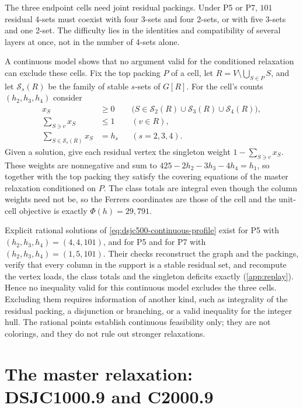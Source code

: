 \documentclass[11pt]{article}
\theoremstyle{definition}
\newcommand{\DSJCThousand}{\textnormal{\textsc{DSJC1000.9}}}
\newcommand{\CTwoThousand}{\textnormal{\textsc{C2000.9}}}
\newcommand{\Stable}{\mathcal{S}}
\begin{document}
The three endpoint cells need joint residual packings. Under P5 or P7,
$101$ residual 4-sets must coexist with four 3-sets and four 2-sets, or with
five 3-sets and one 2-set. The difficulty lies in the identities and
compatibility of several layers at once, not in the number of 4-sets alone.

A continuous model shows that no argument valid for the conditioned
relaxation can exclude these cells. Fix the top packing $P$ of a cell, let
$R=V\setminus\bigcup_{S\in P}S$, and let $\Stable_s(R)$ be the family of
stable $s$-sets of $G[R]$. For the cell's counts $(h_2,h_3,h_4)$ consider
\begin{equation}
\begin{aligned}
 x_S&\ge0 &&\bigl(S\in\Stable_2(R)\cup\Stable_3(R)\cup\Stable_4(R)\bigr),\\
 \sum_{S\ni v}x_S&\le1 &&(v\in R),\\
 \sum_{S\in\Stable_s(R)}x_S&=h_s &&(s=2,3,4).
\end{aligned}
\label{eq:dsjc500-continuous-profile}
\end{equation}
Given a solution, give each residual vertex the singleton weight
$1-\sum_{S\ni v}x_S$. These weights are nonnegative and sum to
$425-2h_2-3h_3-4h_4=h_1$, so together with the top packing they satisfy the
covering equations of the master relaxation conditioned on $P$. The class
totals are integral even though the column weights need not be, so the
Ferrers coordinates are those of the cell and the unit-cell objective is
exactly $\Phi(h)=29{,}791$.

Explicit rational solutions of \eqref{eq:dsjc500-continuous-profile} exist
for P5 with $(h_2,h_3,h_4)=(4,4,101)$, and for P5 and for P7 with
$(h_2,h_3,h_4)=(1,5,101)$. Their checks reconstruct the graph and the
packings, verify that every column in the support is a stable residual set,
and recompute the vertex loads, the class totals and the singleton deficits
exactly (\cref{app:replay}). Hence no inequality valid for this continuous
model excludes the three cells. Excluding them requires information of
another kind, such as integrality of the residual packing, a disjunction or
branching, or a valid inequality for the integer hull. The rational points
establish continuous feasibility only; they are not colorings, and they do
not rule out stronger relaxations.

\section{The master relaxation: \DSJCThousand{} and \CTwoThousand{}}
\label{sec:larger}
\end{document}
